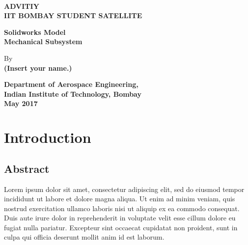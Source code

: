 \documentclass[12pt, a4paper, oneside]{book}
\begin{document}
%
%
\thispagestyle{empty}

{%
\sffamily
\centering
\Large

~\vspace{\fill}

{\huge 
\bfseries{ADVITIY\\ \bigskip IIT BOMBAY STUDENT SATELLITE}
}

\vspace{2cm}

{\LARGE
\bfseries{Solidworks Model\\ \bigskip Mechanical Subsystem}
}

\vspace{2cm}

By \\ \bigskip \bfseries{(Insert your name.)}

\vspace{1.5cm}



\vspace{2.5cm}
\bfseries{Department of Aerospace Engineering, \\ \bigskip Indian Institute of Technology, Bombay\\ \bigskip
May 2017}

}%


\tableofcontents
\clearpage
\listoftables
\clearpage
\listoffigures
\clearpage

\chapter{Introduction}

\section{Abstract}
Lorem ipsum dolor sit amet, consectetur adipiscing elit, sed do eiusmod tempor incididunt ut labore et dolore magna aliqua. Ut enim ad minim veniam, quis nostrud exercitation ullamco laboris nisi ut aliquip ex ea commodo consequat. Duis aute irure dolor in reprehenderit in voluptate velit esse cillum dolore eu fugiat nulla pariatur. Excepteur sint occaecat cupidatat non proident, sunt in culpa qui officia deserunt mollit anim id est laborum.
\end{document}
